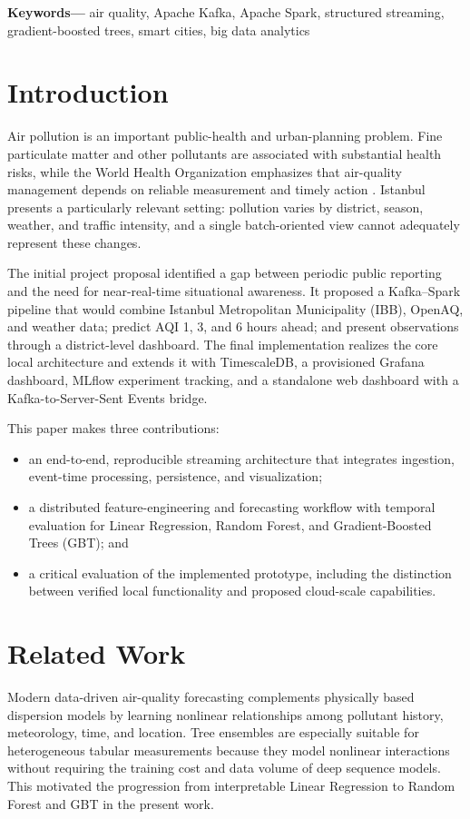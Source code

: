 \documentclass[12pt,a4paper]{article}
\begin{document}
\noindent\textbf{Keywords---}
air quality, Apache Kafka, Apache Spark, structured streaming, gradient-boosted
trees, smart cities, big data analytics

\section{Introduction}
Air pollution is an important public-health and urban-planning problem.
Fine particulate matter and other pollutants are associated with substantial
health risks, while the World Health Organization emphasizes that air-quality
management depends on reliable measurement and timely action
\cite{who_guidelines}. Istanbul presents a particularly relevant setting:
pollution varies by district, season, weather, and traffic intensity, and a
single batch-oriented view cannot adequately represent these changes.

The initial project proposal identified a gap between periodic public reporting
and the need for near-real-time situational awareness. It proposed a
Kafka--Spark pipeline that would combine Istanbul Metropolitan Municipality
(IBB), OpenAQ, and weather data; predict AQI 1, 3, and 6 hours ahead; and
present observations through a district-level dashboard. The final
implementation realizes the core local architecture and extends it with
TimescaleDB, a provisioned Grafana dashboard, MLflow experiment tracking, and a
standalone web dashboard with a Kafka-to-Server-Sent Events bridge.

This paper makes three contributions:
\begin{itemize}
    \item an end-to-end, reproducible streaming architecture that integrates
    ingestion, event-time processing, persistence, and visualization;
    \item a distributed feature-engineering and forecasting workflow with
    temporal evaluation for Linear Regression, Random Forest, and
    Gradient-Boosted Trees (GBT); and
    \item a critical evaluation of the implemented prototype, including the
    distinction between verified local functionality and proposed cloud-scale
    capabilities.
\end{itemize}

\section{Related Work}
Modern data-driven air-quality forecasting complements physically based
dispersion models by learning nonlinear relationships among pollutant history,
meteorology, time, and location. Tree ensembles are especially suitable for
heterogeneous tabular measurements because they model nonlinear interactions
without requiring the training cost and data volume of deep sequence models.
This motivated the progression from interpretable Linear Regression to Random
Forest and GBT in the present work.
\end{document}
